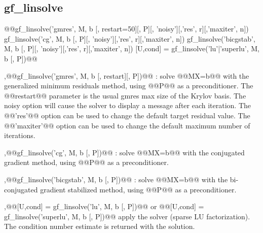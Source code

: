 \subsection{gf\_linsolve}
\begin{synopsis}
@@gf_linsolve('gmres', \tspmat M, \tvec b [, \tint restart=50][, \tprecond P][, 'noisy'][,'res', r][,'maxiter', n])
gf_linsolve('cg', \tspmat M, \tvec b [, \tprecond P][, 'noisy'][,'res', r][,'maxiter', n])
gf_linsolve('bicgstab', \tspmat M, \tvec b [, \tprecond P][, 'noisy'][,'res', r][,'maxiter', n])
[U,cond] = gf_linsolve('lu'|'superlu', \tspmat M, \tvec b [, \tprecond P])@@\end{synopsis}
\begin{cmddescription}
  \sep{@@gf_linsolve('gmres', M, b [, restart][, P])@@} :
  solve @@MX=b@@ with the generalized minimum residuals method, using
  @@P@@ as a preconditioner. The @@restart@@ parameter is the usual gmres max
  size of the Krylov basis. The noisy option will cause the solver to
  display a message after each iteration. The @@'res'@@ option can be
  used to change the default target residual value. The @@'maxiter'@@
  option can be used to change the default maximum number of
  iterations.

  \sep{@@gf_linsolve('cg', M, b [, P])@@} :
  solve @@MX=b@@ with the conjugated gradient method, using @@P@@ as a preconditioner.

  \sep{@@gf_linsolve('bicgstab', M, b [, P])@@} :
  solve @@MX=b@@ with the bi-conjugated gradient stabilized method, using @@P@@ as a
  preconditioner.

  \sep{@@[U,cond] = gf_linsolve('lu', M, b [, P])@@} or
  @@[U,cond] = gf_linsolve('superlu', M, b [, P])@@
  apply the \SuperLU solver (sparse LU factorization). The condition number
  estimate is returned with the solution.
\end{cmddescription}
\newpage

